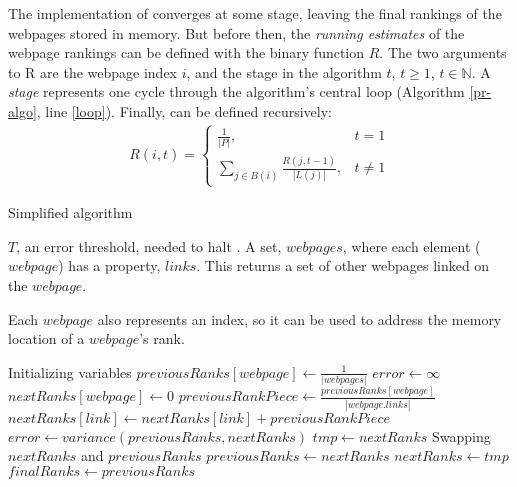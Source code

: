 The implementation of \pr{} converges at some stage, leaving the final rankings of the
webpages stored in memory.  But before then,
the {\it running estimates} of the webpage rankings can be defined with the
binary function $R$.  The two arguments to R are the webpage index $i$,
and the stage in the algorithm $t$, $t \ge 1$, $t \in \mathbb{N}$.  A {\it stage} represents one
cycle through the algorithm's central loop (Algorithm \ref{pr-algo}, line
\ref{loop}). Finally, \pr{} can be defined recursively:
\begin{align}
    R(i, t) = 
    \begin{cases}
        \frac{1}{|P|}, & t = 1\\
        \sum_{j \in B(i)} \frac{R(j, t - 1)}{|L(j)|}, & t \ne 1
    \end{cases}
\end{align}
\begin{algorithm}
\end{algorithm}
\begin{algorithm}
    \caption{Simplified \pr{} algorithm}\label{pr-algo}
    \begin{algorithmic}[1]
    \Require $T$, an error threshold, needed to halt \pr{}.
    \Require A set, $webpages$, where each element ($webpage$) has a
        property, $links$.  This returns a set of other webpages linked on
        the $webpage$.
        
        Each $webpage$ also represents an index, so it can
        be used to address the memory location of a $webpage$'s rank.

    \Comment Initializing variables
        \State $previousRanks[webpage] \gets \frac{1}{|webpages|}$
    \EndFor
    \State $error \gets \infty$\;
    \label{loop}
            \State $nextRanks[webpage] \gets 0$
        \EndFor
                \State $previousRankPiece \gets \frac{previousRanks[webpage]}{|webpage.links|}$
                    \State $nextRanks[link] \gets nextRanks[link] + previousRankPiece$
                \EndFor
            \EndIf
        \EndFor
        \State $error \gets variance(previousRanks, nextRanks)$
        \State $tmp \gets nextRanks$
        \Comment Swapping $nextRanks$ and $previousRanks$
        \State $previousRanks \gets nextRanks$
        \State $nextRanks \gets tmp$
    \EndWhile
    \State $finalRanks \gets previousRanks$
    \end{algorithmic}
\end{algorithm}
